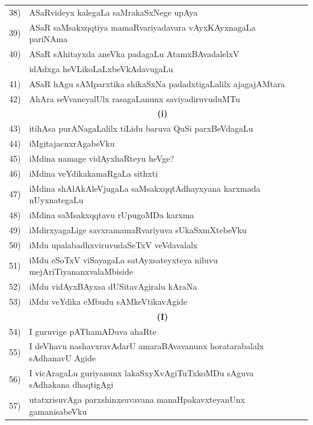 {\begin{longtable}{@{}cp{7.4cm}r}
38) & ASaRvideyx kalegaLa saMrakaSxNege upAya & \pageref{page50} \\
39) & ASaR saMsakxqqtiya mamaRvariyadavara vAyxKAyxnagaLa pariNAma & \pageref{page24}\\
40) & ASaR sAhitayxda aneVka padagaLu AtamxBAvadalelxV & \\
    & idAdxga heVLikoLaLxbeVkAdavugaLu   & \pageref{page246}\\
41) & ASaR hAgu sAMparxtika shikaSxNa padadxtigaLalilx ajagajAMtara  & \pageref{page28}\\
42) & AhAra seVvaneyalUlx rasagaLanunx saviyadiruvuduMTu & \pageref{page221}\\[0.3cm]
    & \multicolumn{1}{c}{\textbf{(i)}} & \\[0.3cm]
43) & itihAsa purANagaLalilx tiLidu baruva QuSi parxBeVdagaLu &  \pageref{page62}\\
44) & iMgitajacnxrAgabeVku  & \pageref{page122}\\
45) & iMdina namage vidAyxhaRteyu heVge? & \pageref{page109}\\
46) & iMdina veYdikakamaRgaLa sithxti & \pageref{page208}\\
47) & iMdina shAlAkAleVjugaLa saMsakxqqtAdhayxyana karxmada nUyxnategaLu & \pageref{page43}\\
48) & iMdina saMsakxqqtavu rUpugoMDa karxma & \pageref{page12}\\
49) &  iMdirxyagaLige savxramamaRvariyuva sUkaSxmXtebeVku & \pageref{page125}\\
50) & iMdu upalabadhxviruvudaSeTxV veVdavalalx & \pageref{page134}\\
51) & iMdu eSoTxV viSayagaLa satAyxsateyxteya niluvu mejAriTiyananxvalaMbiside & \pageref{page215}\\
52) & iMdu vidAyxBAyxsa dUSitavAgiralu kAraNa & \pageref{page41}\\
53) & iMdu veYdika eMbudu sAMkeVtikavAgide & \pageref{page206}\\ [0.3cm]  
    & \multicolumn{1}{c}{\textbf{(I)}} & \\[0.3cm]
54) & I guruvige pAThamADuva ahaRte &  \pageref{page105}\\
55) & I deVhavu nashavxravAdarU amaraBAvavanunx horatarabalalx sAdhanavU Agide &\pageref{page129}\\
56) & I vicAragaLu guriyanunx lakaSxyXvAgiTuTxkoMDu sAguva sAdhakana dhaqtigAgi & \pageref{page218}\\
57) & utatxrisuvAga parxshinxsuvavana manaHpakavxteyanUnx gamanisabeVku & \pageref{page219}\\

\end{longtable}}
